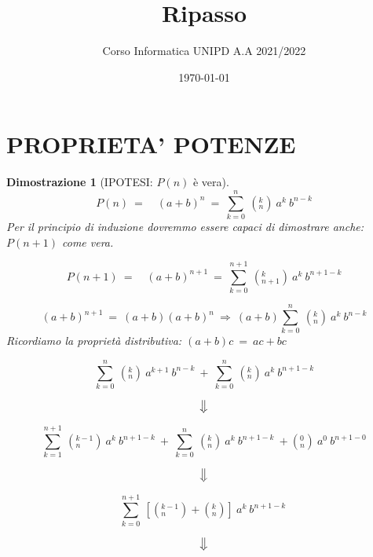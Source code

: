 \documentclass[12pt, a4paper]{article}
\title{Ripasso}
\author{Corso Informatica UNIPD A.A 2021/2022}
\date{\today}
\theoremstyle{break}
\theoremstyle{lemma}
\theoremstyle{lemma}
\newtheorem{dimo}{Dimostrazione}
\theoremstyle{lemma}
\begin{document}
\maketitle

\section{PROPRIETA' POTENZE}
\begin{dimo}[IPOTESI: $P(n)$ è vera]
	
	\begin{equation}
	P(n)\ =\quad (a+b)^n\ =\ \sum_{k=0}^{n}\ (_{n}^{k})\ a^k\ b^{n-k}
	\end{equation}
Per il principio di induzione dovremmo essere capaci di dimostrare anche: 
$P(n+1)$ come vera.

	\begin{equation}
	P(n+1)\ =\quad (a+b)^{n+1}\ =\ 
	\sum_{k=0}^{n+1}\ (_{n+1}^{k})\ a^k\ b^{n+1-k} 
	\end{equation}

	\begin{equation}
	(a+b)^{n+1}\ =\ (a+b)(a+b)^n\ \Rightarrow\ 
	(a+b)\sum_{k=0}^{n}\ (_{n}^{k})\ a^k\ b^{n-k}
	\end{equation}
Ricordiamo la proprietà distributiva: $(a+b)c\ =\ ac + bc$

	\begin{equation}
	\sum_{k=0}^{n}\ (_{n}^{k})\ a^{k+1}\ b^{n-k}\ +\ 
	\sum_{k=0}^{n}\ (_{n}^{k})\ a^k\ b^{n+1-k}
	\end{equation}

	\begin{equation} 
	\big\Downarrow
	\end{equation}

	\begin{equation}
	\sum_{k=1}^{n+1}\ (_{n}^{k-1})\ a^{k}\ b^{n+1-k}\ + \ 
	\sum_{k=0}^{n}\ (_{n}^{k})\ a^k\ b^{n+1-k}\ + (_{n}^{0})\ a^0\ b^{n+1-0}
	\end{equation}

	\begin{equation} 
	\big\Downarrow
	\end{equation}
	
	\begin{equation}
	\sum_{k=0}^{n+1}\ [(_{n}^{k-1}) + (_{n}^{k})]\ a^{k}\ b^{n+1-k}\
	\end{equation}
	
	\begin{equation}
	\big\Downarrow
	\end{equation}
	

\end{dimo}
\end{document}
